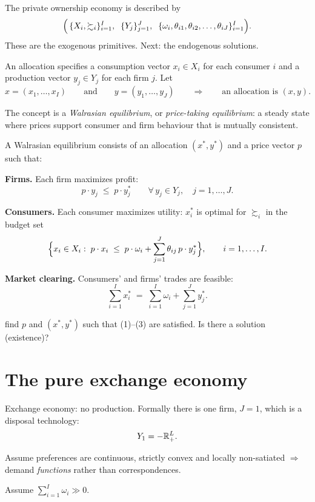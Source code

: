 \documentclass[11pt]{article}
\begin{document}
 The private ownership economy is described by
\[ \Bigl(\,\{X_i,\succsim_i\}_{i=1}^{I},\;\; \{Y_j\}_{j=1}^{J},\;\;
   \{\omega_i,\theta_{i1},\theta_{i2},\dots,\theta_{iJ}\}_{i=1}^{I}\Bigr). \]
These are the exogenous primitives. Next: the endogenous solutions.

An allocation specifies a consumption vector $x_i\in X_i$ for each consumer $i$ and a
production vector $y_j\in Y_j$ for each firm $j$. Let
\[ x=(x_1,\dots,x_I) \qquad\text{and}\qquad y=(y_1,\dots,y_J)
   \qquad\Longrightarrow\qquad \text{an allocation is } (x,y). \]

The concept is a \emph{Walrasian equilibrium}, or \emph{price-taking equilibrium}: a steady
state where prices support consumer and firm behaviour that is mutually consistent.

A Walrasian equilibrium consists of an allocation $(x^*,y^*)$ and a price vector $p$ such
that:
\begin{flatnum}
  \item \textbf{Firms.} Each firm maximizes profit:
        \[ p\cdot y_j\;\le\; p\cdot y_j^* \qquad \forall\, y_j\in Y_j,\quad j=1,\dots,J. \]
  \item \textbf{Consumers.} Each consumer maximizes utility: $x_i^*$ is optimal for
        $\succsim_i$ in the budget set
        \[ \Bigl\{x_i\in X_i:\; p\cdot x_i\;\le\; p\cdot\omega_i
           +\sum_{j=1}^{J}\theta_{ij}\,p\cdot y_j^*\Bigr\}, \qquad i=1,\dots,I. \]
  \item \textbf{Market clearing.} Consumers' and firms' trades are feasible:
        \[ \sum_{i=1}^{I}x_i^* \;=\; \sum_{i=1}^{I}\omega_i+\sum_{j=1}^{J}y_j^*. \]
\end{flatnum}

 find $p$ and $(x^*,y^*)$ such that (1)--(3) are satisfied. Is there a solution
(existence)?


\section{The pure exchange economy}

Exchange economy: no production. Formally there is one firm, $J=1$, which is a disposal
technology:
\[ Y_1=-\mathbb{R}^L_+ . \]

\begin{flatlist}
  \item Assume preferences are continuous, strictly convex and locally non-satiated
        $\Rightarrow$ demand \emph{functions} rather than correspondences.
  \item Assume $\sum_{i=1}^{I}\omega_i\gg 0$.
\end{flatlist}
\end{document}
